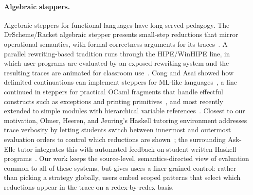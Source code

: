 
\paragraph*{Algebraic steppers.}
Algebraic steppers for functional languages have long served pedagogy. The
DrScheme/Racket algebraic stepper presents small-step reductions that mirror
operational semantics, with formal correctness arguments for its
traces~\cite{clements2001stepper}. A parallel rewriting-based tradition runs
through the HIPE/WinHIPE line, in which user programs are evaluated by an
exposed rewriting system and the resulting traces are animated for classroom
use~\cite{urquiza2007winhipe}. Cong and Asai showed how delimited continuations
can implement steppers for ML-like languages~\cite{cong2016stepper}, a line
continued in steppers for practical OCaml fragments that handle effectful
constructs such as exceptions and printing
primitives~\cite{furukawa2019stepping}, and most recently extended to simple
modules with hierarchical variable references~\cite{asai2025modules}. Closest
to our motivation, Olmer, Heeren, and Jeuring's Haskell tutoring environment
addresses trace verbosity by letting students switch between innermost and
outermost evaluation orders to control which reductions are
shown~\cite{olmer2014evaluating}; the surrounding Ask-Elle tutor integrates
this with automated feedback on student-written Haskell
programs~\cite{gerdes2017askelle}. Our work keeps the source-level,
semantics-directed view of evaluation common to all of these systems, but
gives users a finer-grained control: rather than picking a strategy globally,
users embed scoped patterns that select which reductions appear in
the trace on a redex-by-redex basis.

